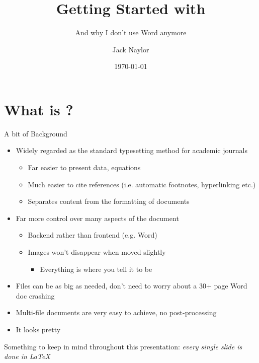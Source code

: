\documentclass[10pt,aspectratio=169]{beamer}
\title{Getting Started with \text{\LaTeX}}
\subtitle{And why I don't use Word anymore}
\date{\today}
\author{Jack Naylor}
\institute{Casual Academic - University of Sydney}
\begin{document}
\maketitle
\section{What is \text{\LaTeX}?}
\begin{frame}{A bit of Background}
    \begin{itemize}
\item Widely regarded as the standard typesetting method for academic journals
\begin{itemize}
\item Far easier to present data, equations
\item Much easier to cite references (i.e. automatic footnotes, hyperlinking etc.)
\item Separates content from the formatting of documents
\end{itemize}
\item Far more control over many aspects of the document
\begin{itemize}
\item Backend rather than frontend (e.g. Word)
\item Images won't disappear when moved slightly
\begin{itemize}
\item Everything is where you tell it to be
\end{itemize}
\end{itemize}
\end{itemize}
\end{frame}
\begin{frame}
\begin{itemize}
\item Files can be as big as needed, don't need to worry about a 30+ page Word doc crashing
\item Multi-file documents are very easy to achieve, no post-processing
\item It looks \alert{pretty}
\end{itemize}
\end{frame}
\begin{frame}
\centering
Something to keep in mind throughout this presentation: \emph{\alert{every single slide} is done in \LaTeX}
\end{frame}
\end{document}
